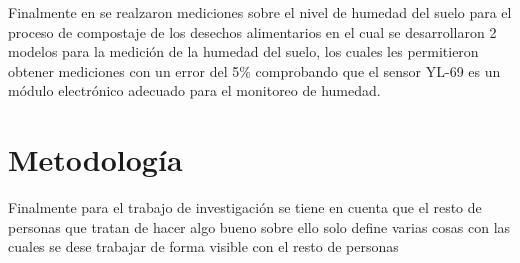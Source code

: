 \documentclass[conference]{IEEEtran}
\begin{document}
	Finalmente en \cite{lowcosthumidity} se realzaron mediciones sobre el nivel de humedad del suelo para el proceso de compostaje de los desechos alimentarios en el cual se desarrollaron 2 modelos para la medición de la humedad del suelo, los cuales les permitieron obtener mediciones con un error del 5\% comprobando que el sensor YL-69 es un módulo electrónico adecuado para el monitoreo de humedad.
	
	\section{Metodología}
	Finalmente para el trabajo de investigación se tiene en cuenta que el resto de personas que tratan de hacer algo bueno sobre ello solo define varias cosas con las cuales se dese trabajar de forma visible con el resto de personas
	
	
	
\end{document}
